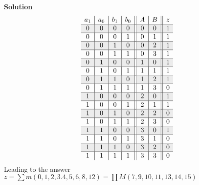 \begin{enumerate}
                        \begin{onlysolution}  \textbf{Solution}
                            $$
                            \begin{array}{c|c|c|c||c|c||c}
                                a_1 & a_0 & b_1 & b_0 & A  & B & z  \\ \hline \rowcolor{gray!15}
                                0 & 0 & 0 & 0 & 0 & 0 & 1           \\ \hline
                                0 & 0 & 0 & 1 & 0 & 1 & 1           \\ \hline \rowcolor{gray!15}
                                0 & 0 & 1 & 0 & 0 & 2 & 1           \\ \hline
                                0 & 0 & 1 & 1 & 0 & 3 & 1           \\ \hline \rowcolor{gray!15}
                                0 & 1 & 0 & 0 & 1 & 0 & 1           \\ \hline
                                0 & 1 & 0 & 1 & 1 & 1 & 1           \\ \hline \rowcolor{gray!15}
                                0 & 1 & 1 & 0 & 1 & 2 & 1           \\ \hline
                                0 & 1 & 1 & 1 & 1 & 3 & 0           \\ \hline \rowcolor{gray!15}
                                1 & 0 & 0 & 0 & 2 & 0 & 1           \\ \hline
                                1 & 0 & 0 & 1 & 2 & 1 & 1           \\ \hline \rowcolor{gray!15}
                                1 & 0 & 1 & 0 & 2 & 2 & 0           \\ \hline
                                1 & 0 & 1 & 1 & 2 & 3 & 0           \\ \hline \rowcolor{gray!15}
                                1 & 1 & 0 & 0 & 3 & 0 & 1           \\ \hline
                                1 & 1 & 0 & 1 & 3 & 1 & 0           \\ \hline \rowcolor{gray!15}
                                1 & 1 & 1 & 0 & 3 & 2 & 0           \\ \hline
                                1 & 1 & 1 & 1 & 3 & 3 & 0           \\
                            \end{array}$$
                            Leading to the answer
                            $ z = \sum m(0,1,2,3.4,5,6,8,12) = \prod M(7,9,10,11,13,14,15)$
                        \end{onlysolution}


\end{enumerate}
